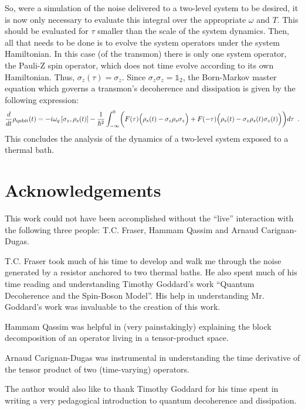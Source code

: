 \documentclass{article}
\begin{document}
So, were a simulation of the noise delivered to a two-level system to be desired, it
is now only necessary to evaluate this integral over the appropriate $ \omega $
and $ T $. This should be evaluated for $ \tau $ smaller than the scale of the system
dynamics. Then, all that needs to be done is to evolve the system operators
under the system Hamiltonian. In this case (of the transmon) there is only one system
operator, the Pauli-Z spin operator, which does not time evolve according to its
own Hamiltonian. Thus, $ \sigma_{z}(\tau) = \sigma_{z} $. Since $
\sigma_{z} \sigma_{z} = \mathds{1}_{2} $, the Born-Markov master equation which
governs a transmon's decoherence and dissipation is given by the following
expression:
\begin{equation}
   \frac{d}{dt} \rho_{\textrm{qubit}}(t) = -i \omega_{q} \left[ \sigma_{z} ,
      \rho_{s}(t) \right] - \frac{1}{\hbar^{2}}
      \int_{-\infty}^{0} \biggl( F(\tau) \Bigl(
         \rho_{s}(t) - \sigma_{z} \rho_{s} \sigma_{z} \Bigr)
         +
         F(-\tau) \Bigl( \rho_{s}(t) - \sigma_{z} \rho_{s}(t) \sigma_{z}(t)
      \Bigr) \biggr) d\tau \enskip.
\end{equation}
This concludes the analysis of the dynamics of a  two-level system exposed to a
thermal bath.

\section{Acknowledgements}
\label{sec:acknowledgements}
This work could not have been accomplished without the ``live'' interaction with
the following three people: T.C. Fraser, Hammam Qassim and Arnaud
Carignan-Dugas.

T.C. Fraser took much of his time to develop and walk me through the noise
generated by a resistor anchored to two thermal baths. He also spent much of his
time reading and understanding Timothy Goddard's work ``Quantum Decoherence and
the Spin-Boson Model''. His help in understanding Mr. Goddard's work was
invaluable to the creation of this work.

Hammam Qassim was helpful in (very painstakingly) explaining the block
decomposition of an operator living in a tensor-product space.

Arnaud Carignan-Dugas was instrumental in understanding the time derivative of
the tensor product of two (time-varying) operators.

The author would also like to thank Timothy Goddard for his time spent in
writing a very pedagogical introduction to quantum decoherence and dissipation.
\end{document}
